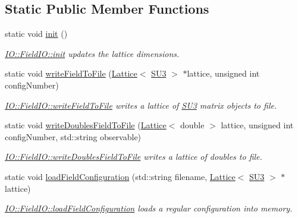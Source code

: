 \subsection*{Static Public Member Functions}
\begin{DoxyCompactItemize}
\item 
static void \mbox{\hyperlink{class_i_o_1_1_field_i_o_a9093930584128c73a63fe8015bff9b38}{init}} ()
\begin{DoxyCompactList}\small\item\em \mbox{\hyperlink{class_i_o_1_1_field_i_o_a9093930584128c73a63fe8015bff9b38}{I\+O\+::\+Field\+I\+O\+::init}} updates the lattice dimensions. \end{DoxyCompactList}\item 
static void \mbox{\hyperlink{class_i_o_1_1_field_i_o_a8af607f9a1d79e90d4514c36103c6601}{write\+Field\+To\+File}} (\mbox{\hyperlink{class_lattice}{Lattice}}$<$ \mbox{\hyperlink{class_s_u3}{S\+U3}} $>$ $\ast$lattice, unsigned int config\+Number)
\begin{DoxyCompactList}\small\item\em \mbox{\hyperlink{class_i_o_1_1_field_i_o_a8af607f9a1d79e90d4514c36103c6601}{I\+O\+::\+Field\+I\+O\+::write\+Field\+To\+File}} writes a lattice of \mbox{\hyperlink{class_s_u3}{S\+U3}} matrix objects to file. \end{DoxyCompactList}\item 
static void \mbox{\hyperlink{class_i_o_1_1_field_i_o_aaf2bac2025d67c06e7c61e8cc9f44777}{write\+Doubles\+Field\+To\+File}} (\mbox{\hyperlink{class_lattice}{Lattice}}$<$ double $>$ lattice, unsigned int config\+Number, std\+::string observable)
\begin{DoxyCompactList}\small\item\em \mbox{\hyperlink{class_i_o_1_1_field_i_o_aaf2bac2025d67c06e7c61e8cc9f44777}{I\+O\+::\+Field\+I\+O\+::write\+Doubles\+Field\+To\+File}} writes a lattice of doubles to file. \end{DoxyCompactList}\item 
static void \mbox{\hyperlink{class_i_o_1_1_field_i_o_a02db864a48601edd7febaab5d655e495}{load\+Field\+Configuration}} (std\+::string filename, \mbox{\hyperlink{class_lattice}{Lattice}}$<$ \mbox{\hyperlink{class_s_u3}{S\+U3}} $>$ $\ast$lattice)
\begin{DoxyCompactList}\small\item\em \mbox{\hyperlink{class_i_o_1_1_field_i_o_a02db864a48601edd7febaab5d655e495}{I\+O\+::\+Field\+I\+O\+::load\+Field\+Configuration}} loads a regular configuration into memory. \end{DoxyCompactList}\item 

\end{DoxyCompactItemize}
